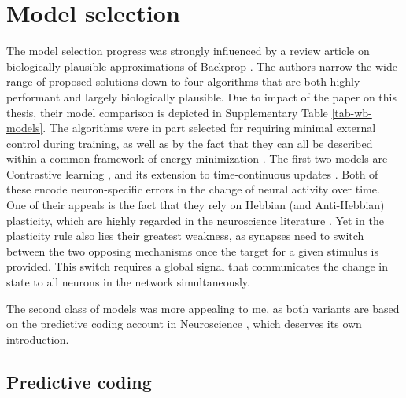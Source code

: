 \section{Model selection}\label{sec-model-selection}

The model selection progress was strongly influenced by a review article on biologically plausible approximations of
Backprop \citep{whittington2019theories}. The authors narrow the wide range of proposed solutions down to four
algorithms that are both highly performant and largely biologically plausible. Due to impact of the paper on this
thesis, their model comparison is depicted in Supplementary Table \ref{tab-wb-models}. The algorithms were in part
selected for requiring minimal external control during training, as well as by the fact that they can all be described
within a common framework of energy minimization \citep{Scellier2017}. The first two models are Contrastive learning
\citep{OReilly1996}, and its extension to time-continuous updates \citep{Bengio2017}. Both of these encode
neuron-specific errors in the change of neural activity over time. One of their appeals is the fact that they rely on
Hebbian (and Anti-Hebbian) plasticity, which are highly regarded in the neuroscience literature
\citep{magee2020synaptic,Brea2016}. Yet in the plasticity rule also lies their greatest weakness, as synapses need to
switch between the two opposing mechanisms once the target for a given stimulus is provided. This switch requires a
global signal that communicates the change in state to all neurons in the network simultaneously.

The second class of models was more appealing to me, as both variants are based on the predictive coding account in
Neuroscience \citep{rao1999predictive}, which deserves its own introduction.

\subsection{Predictive coding}


